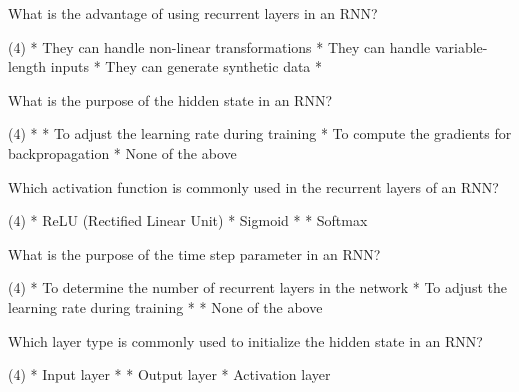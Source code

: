\documentclass[10pt]{extarticle}
\begin{document}
\begin{exercise}
    What is the advantage of using recurrent layers in an RNN?
    \begin{choice} (4)
        * They can handle non-linear transformations
        * They can handle variable-length inputs
        * They can generate synthetic data
        * 
    \end{choice}
\end{exercise}
\begin{solution}
\end{solution}

\begin{exercise}
    What is the purpose of the hidden state in an RNN?
    \begin{choice} (4)
        * 
        * To adjust the learning rate during training
        * To compute the gradients for backpropagation
        * None of the above
    \end{choice}
\end{exercise}
\begin{solution}
\end{solution}

\begin{exercise}
    Which activation function is commonly used in the recurrent layers of an RNN?
    \begin{choice} (4)
        * ReLU (Rectified Linear Unit)
        * Sigmoid
        * 
        * Softmax
    \end{choice}
\end{exercise}
\begin{solution}
\end{solution}

\begin{exercise}
    What is the purpose of the time step parameter in an RNN?
    \begin{choice} (4)
        * To determine the number of recurrent layers in the network
        * To adjust the learning rate during training
        * 
        * None of the above
    \end{choice}
\end{exercise}
\begin{solution}
\end{solution}

\begin{exercise}
    Which layer type is commonly used to initialize the hidden state in an RNN?
    \begin{choice} (4)
        * Input layer
        * 
        * Output layer
        * Activation layer
    \end{choice}
\end{exercise}
\begin{solution}
\end{solution}
\end{document}
